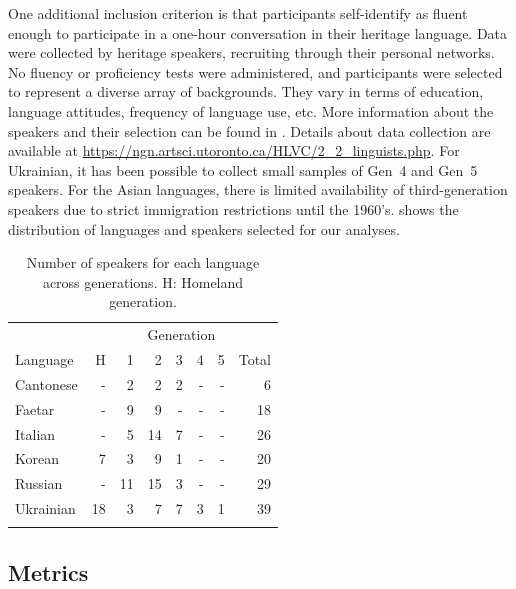 \documentclass[output=paper]{langscibook}
\begin{document}
One additional inclusion criterion is that participants self-identify as fluent enough to participate in a one-hour conversation in their heritage language. Data were collected by heritage speakers, recruiting through their personal networks. No fluency or proficiency tests were administered, and participants were selected to represent a diverse array of backgrounds. They vary in terms of education, language attitudes, frequency of language use, etc. More information about the speakers and their selection can be found in \citet{nagy2011, nagy2015sociolinguistic,nagy24}. Details about data collection are available at \url{https://ngn.artsci.utoronto.ca/HLVC/2_2_linguists.php}. For Ukrainian, it has been possible to collect small samples of Gen~4 and Gen~5 speakers. For the Asian languages, there is limited availability of third-generation speakers due to strict immigration restrictions until the 1960's. 
 shows the distribution of languages and speakers selected for our analyses. 

\begin{table}
\begin{tabular}{lrrrrrrr}
\lsptoprule
  & \multicolumn{7}{c}{{Generation}} \\\cmidrule(lr){2-7}
{Language}  & {H} & {1} & {2} & {3} & {4} & {5} & {Total} \\\midrule
{Cantonese} & -   & 2          & 2          & 2          & -          & -          & 6              \\
{Faetar}    & -   & 9          & 9          & -          & -          & -          & 18             \\
{Italian}   & -   & 5          & 14         & 7          & -          & -          & 26             \\
{Korean}    & 7   & 3          & 9          & 1          & -          & -          & 20             \\
{Russian}   & -   & 11         & 15         & 3          & -          & -          & 29             \\
{Ukrainian} & 18  & 3          & 7          & 7          & 3          & 1          & 39             \\
\lspbottomrule
\end{tabular}
\caption{Number of speakers for each language across generations. H: Homeland generation.}
\label{table:basic_stats}
\end{table}


\subsection{Metrics}
\end{document}
